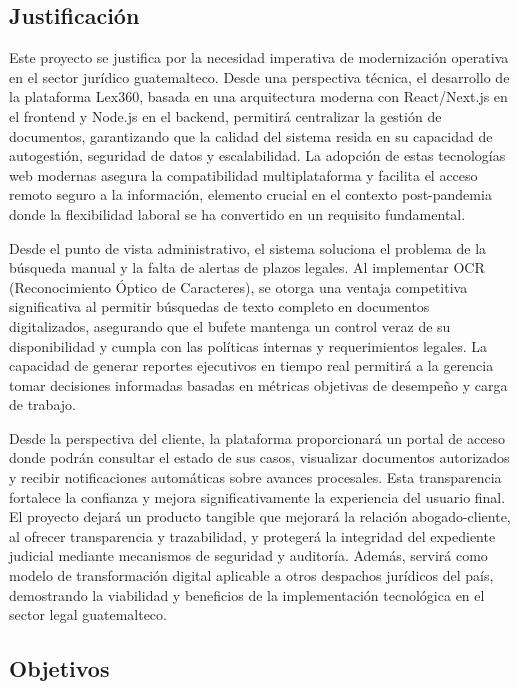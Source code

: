 \documentclass[12pt, letterpaper]{article}
\begin{document}
\subsection{Justificación}
Este proyecto se justifica por la necesidad imperativa de modernización operativa en el sector jurídico guatemalteco. Desde una perspectiva técnica, el desarrollo de la plataforma Lex360, basada en una arquitectura moderna con React/Next.js en el frontend y Node.js en el backend, permitirá centralizar la gestión de documentos, garantizando que la calidad del sistema resida en su capacidad de autogestión, seguridad de datos y escalabilidad. La adopción de estas tecnologías web modernas asegura la compatibilidad multiplataforma y facilita el acceso remoto seguro a la información, elemento crucial en el contexto post-pandemia donde la flexibilidad laboral se ha convertido en un requisito fundamental.

Desde el punto de vista administrativo, el sistema soluciona el problema de la búsqueda manual y la falta de alertas de plazos legales. Al implementar OCR (Reconocimiento Óptico de Caracteres), se otorga una ventaja competitiva significativa al permitir búsquedas de texto completo en documentos digitalizados, asegurando que el bufete mantenga un control veraz de su disponibilidad y cumpla con las políticas internas y requerimientos legales. La capacidad de generar reportes ejecutivos en tiempo real permitirá a la gerencia tomar decisiones informadas basadas en métricas objetivas de desempeño y carga de trabajo.

Desde la perspectiva del cliente, la plataforma proporcionará un portal de acceso donde podrán consultar el estado de sus casos, visualizar documentos autorizados y recibir notificaciones automáticas sobre avances procesales. Esta transparencia fortalece la confianza y mejora significativamente la experiencia del usuario final. El proyecto dejará un producto tangible que mejorará la relación abogado-cliente, al ofrecer transparencia y trazabilidad, y protegerá la integridad del expediente judicial mediante mecanismos de seguridad y auditoría. Además, servirá como modelo de transformación digital aplicable a otros despachos jurídicos del país, demostrando la viabilidad y beneficios de la implementación tecnológica en el sector legal guatemalteco.

\subsection{Objetivos}
\end{document}
